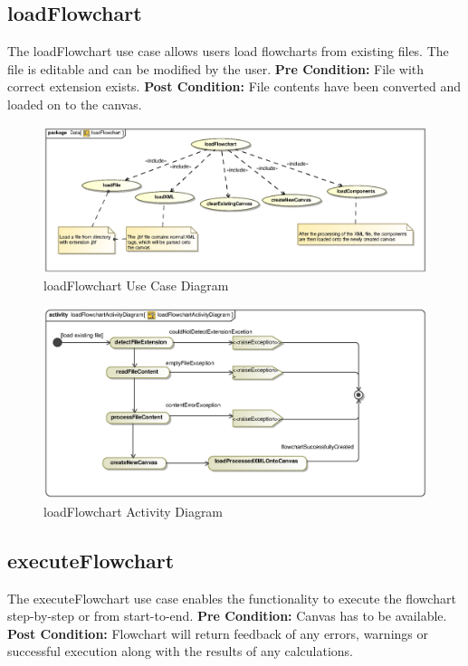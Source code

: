 \documentclass[12pt,a4paper,titlepage]{article}
\begin{document}
\newpage
\subsection{loadFlowchart}
The loadFlowchart use case allows users load flowcharts from existing files. The file is editable and can be modified by the user.\newline\newline
\textbf{Pre Condition:} File with correct extension exists.\newline\newline
\textbf{Post Condition:} File contents have been converted and loaded on to the canvas.

\begin{figure}[H]
  \centering
\includegraphics[width=500px]{loadFlowchart.eps}
\caption{loadFlowchart Use Case Diagram}
\end{figure}

\begin{figure}[H]
  \centering
\includegraphics[width=500px]{loadFlowchartActivityDiagram.eps}
\caption{loadFlowchart Activity Diagram}
\end{figure}



\newpage
\subsection{executeFlowchart}
The executeFlowchart use case enables the functionality to execute the flowchart step-by-step or from start-to-end.\newline\newline
\textbf{Pre Condition:} Canvas has to be available.\newline\newline
\textbf{Post Condition:} Flowchart will return feedback of any errors, warnings or successful execution along with the results of any calculations.
\end{document}
